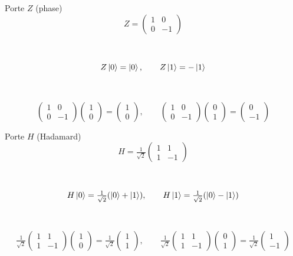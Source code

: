 \documentclass[aspectratio=169,12pt]{beamer}
\begin{document}
\begin{frame}{Porte $Z$ (phase)}
  \[
    Z = \begin{pmatrix}1 & 0 \\ 0 & -1\end{pmatrix}
  \]
  ~\\~\\
  \[
    Z\ket 0 = \ket 0, \qquad
    Z\ket 1 = -\ket 1
  \]
  ~\\~\\
  \[
    \begin{pmatrix}1 & 0 \\ 0 & -1\end{pmatrix}
    \begin{pmatrix}1\\0\end{pmatrix}=
    \begin{pmatrix}1\\0\end{pmatrix},
    \qquad
    \begin{pmatrix}1 & 0 \\ 0 & -1\end{pmatrix}
    \begin{pmatrix}0\\1\end{pmatrix}=
    \begin{pmatrix}0\\-1\end{pmatrix}
  \]
\end{frame}

\begin{frame}{Porte $H$ (Hadamard)}
  \[
    H = \tfrac{1}{\sqrt{2}}\begin{pmatrix}1 & 1 \\ 1 & -1\end{pmatrix}
  \]
  ~\\~\\
  \[
    H\ket 0 = \tfrac{1}{\sqrt{2}}(\ket 0+\ket 1), \qquad
    H\ket 1 = \tfrac{1}{\sqrt{2}}(\ket 0-\ket 1)
  \]
  ~\\~\\
  \[
    \tfrac{1}{\sqrt{2}}\begin{pmatrix}1 & 1 \\ 1 & -1\end{pmatrix}
    \begin{pmatrix}1\\0\end{pmatrix}=
    \tfrac{1}{\sqrt{2}}\begin{pmatrix}1\\1\end{pmatrix},
    \qquad
    \tfrac{1}{\sqrt{2}}\begin{pmatrix}1 & 1 \\ 1 & -1\end{pmatrix}
    \begin{pmatrix}0\\1\end{pmatrix}=
    \tfrac{1}{\sqrt{2}}\begin{pmatrix}1\\-1\end{pmatrix}
  \]
\end{frame}
\end{document}
